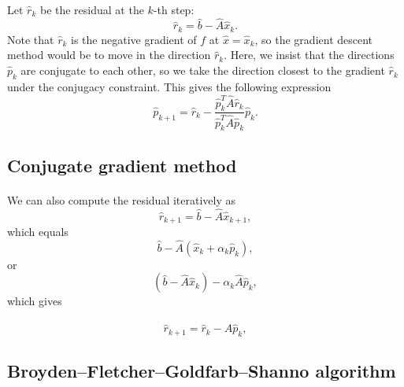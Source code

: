 \documentclass[%
oneside,                 %
final,                   %
10pt]{article}
\begin{document}
\paragraph{}
Let  $\hat{r}_k$ be the residual at the $k$-th step:
\begin{equation*}
\hat{r}_k=\hat{b}-\hat{A}\hat{x}_k.
\end{equation*}
Note that $\hat{r}_k$ is the negative gradient of $f$ at 
$\hat{x}=\hat{x}_k$, 
so the gradient descent method would be to move in the direction $\hat{r}_k$. 
Here, we insist that the directions $\hat{p}_k$ are conjugate to each other, 
so we take the direction closest to the gradient $\hat{r}_k$  
under the conjugacy constraint. 
This gives the following expression
\begin{equation*}
\hat{p}_{k+1}=\hat{r}_k-\frac{\hat{p}_k^T \hat{A}\hat{r}_k}{\hat{p}_k^T\hat{A}\hat{p}_k} \hat{p}_k.
\end{equation*}



\subsection*{Conjugate gradient method}

\paragraph{}
We can also  compute the residual iteratively as
\begin{equation*}
\hat{r}_{k+1}=\hat{b}-\hat{A}\hat{x}_{k+1},
 \end{equation*}
which equals
\begin{equation*}
\hat{b}-\hat{A}(\hat{x}_k+\alpha_k\hat{p}_k),
 \end{equation*}
or
\begin{equation*}
(\hat{b}-\hat{A}\hat{x}_k)-\alpha_k\hat{A}\hat{p}_k,
 \end{equation*}
which gives

\begin{equation*}
\hat{r}_{k+1}=\hat{r}_k-\hat{A}\hat{p}_{k},
 \end{equation*}



\subsection*{Broyden–Fletcher–Goldfarb–Shanno algorithm}
\end{document}
